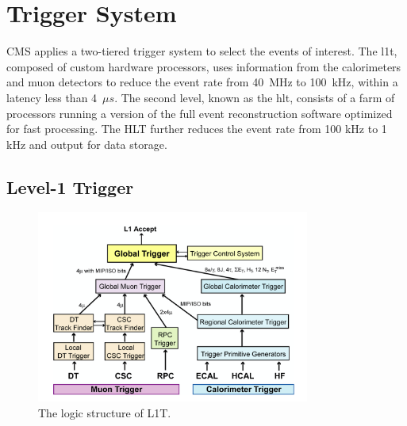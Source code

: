 \section{Trigger System}
\label{sec:cmsexperiment:trigger}

CMS applies a two-tiered trigger system \cite{cms:trigger:Khachatryan:2016bia} to select the events of interest. The \acrfull{l1t}, composed of custom hardware processors, uses information from the calorimeters and muon detectors to reduce the event rate from 40~MHz to 100~kHz, within a latency less than 4~$\mu s$. The second level, known as the \acrfull{hlt}, consists of a farm of processors running a version of the full event reconstruction software optimized for fast processing. The HLT further reduces the event rate from 100 kHz to 1 kHz and output for data storage.



\subsection{Level-1 Trigger}

\begin{figure}[ht]
    \centering
    \includegraphics[width=0.8\textwidth]{chapters/CMSExperiment/sectionTrigger/figures/trigger.png}
    \caption{The logic structure of L1T.}
    \label{fig:cmsexperiment:trigger:structure}
\end{figure}

